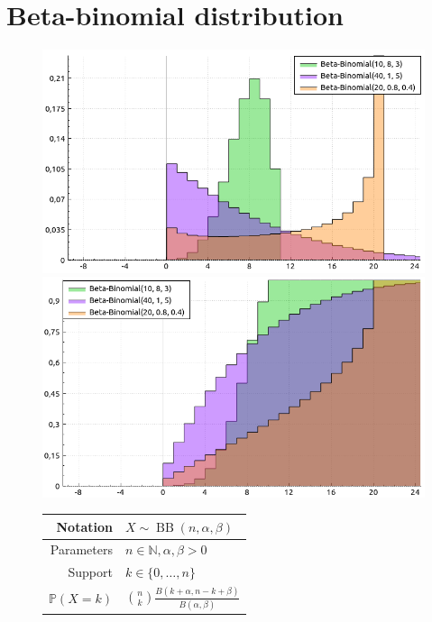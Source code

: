 \documentclass[a4paper,11pt]{article}
\theoremstyle{plain}
\theoremstyle{definition}
\newcommand{\MP}{\mathbb{P}}
\newcommand{\MN}{\mathbb{N}}
\begin{document}
	\section{Beta-binomial distribution}
	\begin{figure}[!htb]\centering
		\begin{minipage}{0.55\textwidth}
			\includegraphics[width=\linewidth, right]{beta-binomial_pmf}
			\captionsetup{labelformat=empty}
			\includegraphics[width=\linewidth, right]{beta-binomial_cdf}
			\captionsetup{labelformat=empty}
		\end{minipage}
		\begin{minipage}{0.4\textwidth}
			\begin{tabular}{| r | l |}
				\hline
				Notation & $ X \sim \operatorname{BB}(n, \alpha, \beta) $ \\
				\hline
				Parameters & $ n \in \MN, \alpha, \beta > 0  $ \\
				\hline
				Support & $ k \in \{0, \dots, n  \} $  \\
				\hline
				$\MP(X = k)$ & $\binom{n}{k} \frac{B(k+\alpha, n-k+\beta)}{B(\alpha, \beta)}  $ \\

\end{tabular}
\end{minipage}
\end{figure}
\end{document}
